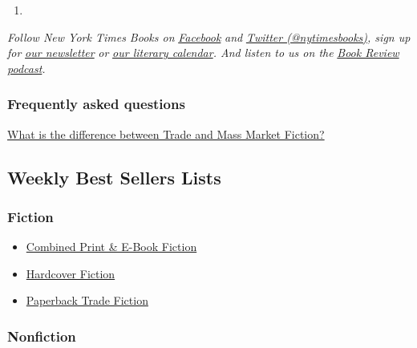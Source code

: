 \begin{enumerate}
\def\labelenumi{\arabic{enumi}.}
\tightlist
\item
  \href{https://www.nytimes3xbfgragh.onion/2020/07/31/books/review/the-system-robert-reich-break-em-up-zephyr-teachout.html}{}
\end{enumerate}

\emph{Follow New York Times Books on}
\href{https://www.facebookcorewwwi.onion/nytbooks/}{\emph{Facebook}}
\emph{and} \href{https://twitter.com/nytimesbooks}{\emph{Twitter
(@nytimesbooks)}}\emph{, sign up for}
\href{https://www.nytimes3xbfgragh.onion/newsletters/books-review}{\emph{our
newsletter}} \emph{or}
\href{https://www.nytimes3xbfgragh.onion/interactive/2017/books/books-calendar.html}{\emph{our
literary calendar}}\emph{. And listen to us on the}
\href{https://www.nytimes3xbfgragh.onion/column/book-review-podcast}{\emph{Book
Review podcast}}\emph{.}

\hypertarget{frequently-asked-questions}{%
\subsubsection{Frequently asked
questions}\label{frequently-asked-questions}}

\href{/2008/03/16/books/review/PaperRow-t.html}{What is the difference
between Trade and Mass Market Fiction?}

\hypertarget{weekly-best-sellers-lists}{%
\subsection{Weekly Best Sellers Lists}\label{weekly-best-sellers-lists}}

\hypertarget{fiction}{%
\subsubsection{Fiction}\label{fiction}}

\begin{itemize}
\tightlist
\item
  \href{/books/best-sellers/combined-print-and-e-book-fiction/}{Combined
  Print \& E-Book Fiction}
\item
  \href{/books/best-sellers/hardcover-fiction/}{Hardcover Fiction}
\item
  \href{/books/best-sellers/trade-fiction-paperback/}{Paperback Trade
  Fiction}
\end{itemize}

\hypertarget{nonfiction}{%
\subsubsection{Nonfiction}\label{nonfiction}}

